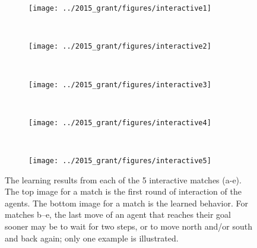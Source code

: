 
\begin{figure}
    \centering
    \begin{subfigure}[b]{0.18\textwidth}
        \texttt{[image: ../2015\_grant/figures/interactive1]}
        \caption{}
        \label{fig:inter1}
    \end{subfigure}
    ~ %
    \begin{subfigure}[b]{0.18\textwidth}
        \texttt{[image: ../2015\_grant/figures/interactive2]}
        \caption{}
        \label{fig:inter2}
    \end{subfigure}
    ~ %
    \begin{subfigure}[b]{0.18\textwidth}
        \texttt{[image: ../2015\_grant/figures/interactive3]}
        \caption{}
        \label{fig:inter3}
    \end{subfigure}
	~ %
    \begin{subfigure}[b]{0.18\textwidth}
        \texttt{[image: ../2015\_grant/figures/interactive4]}
        \caption{}
        \label{fig:inter4}
    \end{subfigure}
    ~ %
    \begin{subfigure}[b]{0.18\textwidth}
        \texttt{[image: ../2015\_grant/figures/interactive5]}
        \caption{}
        \label{fig:inter5}
    \end{subfigure}
    \caption{The learning results from each of the 5 interactive matches (a-e). The top image for a match is the first round of interaction of the agents. The bottom image for a match is the learned behavior. For matches b--e, the last move of an agent that reaches their goal sooner may be to wait for two steps, or to move north and/or south and back again; only one example is illustrated.}\label{fig:interRes}
\end{figure}

